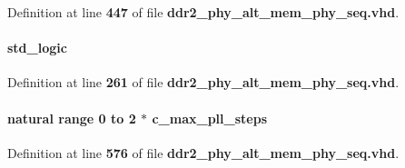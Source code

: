 Definition at line {\bf 447} of file {\bf ddr2\+\_\+phy\+\_\+alt\+\_\+mem\+\_\+phy\+\_\+seq.\+vhd}.

\paragraph[{codvw\+\_\+grt\+\_\+one\+\_\+dvw}]{ {\bfseries \textcolor{comment}{std\+\_\+logic}\textcolor{vhdlchar}{ }} \hspace{0.3cm}{\ttfamily [Record]}}\label{classddr2__phy__alt__mem__phy__record__pkg_a3fe98c8365cb7129865dbb7c331e0af5}


Definition at line {\bf 261} of file {\bf ddr2\+\_\+phy\+\_\+alt\+\_\+mem\+\_\+phy\+\_\+seq.\+vhd}.

\paragraph[{codvw\+\_\+phase}]{ {\bfseries \textcolor{comment}{natural}\textcolor{vhdlchar}{ }\textcolor{vhdlchar}{ }\textcolor{vhdlchar}{ }\textcolor{keywordflow}{range}\textcolor{vhdlchar}{ }\textcolor{vhdlchar}{ } \textcolor{vhdldigit}{0} \textcolor{vhdlchar}{ }\textcolor{keywordflow}{to}\textcolor{vhdlchar}{ }\textcolor{vhdlchar}{ } \textcolor{vhdldigit}{2} \textcolor{vhdlchar}{$\ast$}\textcolor{vhdlchar}{ }\textcolor{vhdlchar}{ }\textcolor{vhdlchar}{ }{\bfseries {\bf c\+\_\+max\+\_\+pll\+\_\+steps}} \textcolor{vhdlchar}{ }} \hspace{0.3cm}{\ttfamily [Record]}}\label{classddr2__phy__alt__mem__phy__record__pkg_a1a87979708503e0a154225d56309d657}


Definition at line {\bf 576} of file {\bf ddr2\+\_\+phy\+\_\+alt\+\_\+mem\+\_\+phy\+\_\+seq.\+vhd}.

